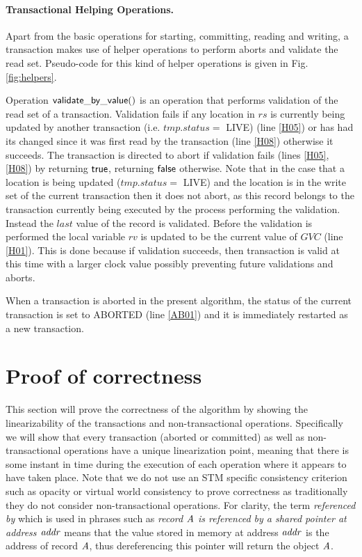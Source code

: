 \paragraph{Transactional Helping Operations.} 
Apart from the basic operations for starting, committing, 
reading and writing, a transaction makes use of helper 
operations to perform aborts and validate the read set.
 Pseudo-code for this kind of helper operations 
is given in Fig. \ref{fig:helpers}.

Operation ${\sf validate\_by\_value()}$ is an operation that performs 
validation of the read set of a transaction. 
Validation fails 
if any location in $\mathit{rs}$ is 
currently being updated by another transaction (i.e. $\mathit{tmp.status} = $ LIVE) (line \ref{H05})
or has had its changed since it was first read by the transaction (line \ref{H08})
otherwise it succeeds.
The transaction is directed to abort if validation fails (lines \ref{H05}, \ref{H08}) by returning $\sf{true}$,
returning $\sf{false}$ otherwise.
Note that in the case that a location is being updated ($\mathit{tmp.status} = $ LIVE) and the location
is in the write set of the current transaction then it does not abort, as this record belongs to the transaction
currently being executed by the process performing the validation.
Instead the $\mathit{last}$ value of the record is validated.
Before the validation is performed the local variable $\mathit{rv}$ is updated
to be the current value of $\mathit{GVC}$ (line \ref{H01}).
This is done because if validation succeeds, then transaction is valid at this time
with a larger
clock value possibly preventing future validations and aborts.

When a transaction is aborted in the present algorithm, 
the status of the current transaction is set to ABORTED (line \ref{AB01}) and
it is immediately restarted as a new transaction.





\section{Proof of correctness}
This section will prove the correctness of the algorithm by showing the linearizability
of the transactions and non-transactional operations.
Specifically we will show that every transaction (aborted or committed) as well
as non-transactional operations have a unique linearization point, meaning that
there is some instant in time during the execution of each operation where it
appears to have taken place.
Note that we do not use an STM specific consistency criterion
such as opacity or virtual world consistency to prove correctness as traditionally they do not consider
non-transactional operations.
For clarity, the term \emph{referenced by} which is used in phrases such as \emph{record $\ms{A}$ is referenced by
a shared pointer at address $\ms{addr}$} means that the value stored in memory at address $\ms{addr}$
is the address of record $\ms{A}$, thus dereferencing this pointer will return the object $\ms{A}$.


